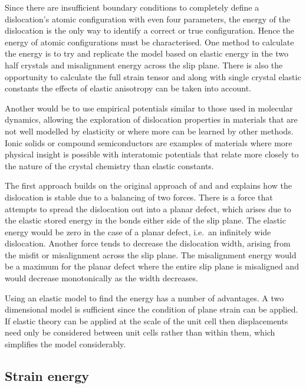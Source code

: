

Since there are insufficient boundary conditions to completely define a dislocation's atomic configuration with even four parameters, the energy of the dislocation is the only way to identify a correct or true configuration. Hence the energy of atomic configurations must be characterised. One method to calculate the energy is to try and replicate the model based on elastic energy in the two half crystals and misalignment energy across the slip plane. There is also the opportunity to calculate the full strain tensor and along with single crystal elastic constants the effects of elastic anisotropy can be taken into account. 

Another would be to use empirical potentials similar to those used in molecular dynamics, allowing the exploration of dislocation properties in materials that are not well modelled by elasticity or where more can be learned by other methods. Ionic solids or compound semiconductors are examples of materials where more physical insight is possible with interatomic potentials that relate more closely to the nature of the crystal chemistry than elastic constants. 



The first approach builds on the original approach of \citet{Peierls1940} and \citet{Nabarro1947} and explains how the dislocation is stable due to a balancing of two forces. There is a force that attempts to spread the dislocation out into a planar defect, which arises due to the elastic stored energy in the bonds either side of the slip plane. The elastic energy would be zero in the case of a planar defect, i.e.\ an infinitely wide dislocation. Another force tends to decrease the dislocation width, arising from the misfit or misalignment across the slip plane. The misalignment energy would be a maximum for the planar defect where the entire slip plane is misaligned and would decrease monotonically as the width decreases.

Using an elastic model to find the energy has a number of advantages. A two dimensional model is sufficient since the condition of plane strain can be applied. If elastic theory can be applied at the scale of the unit cell then displacements need only be considered between unit cells rather than within them, which simplifies the model considerably.

\subsection{Strain energy}

